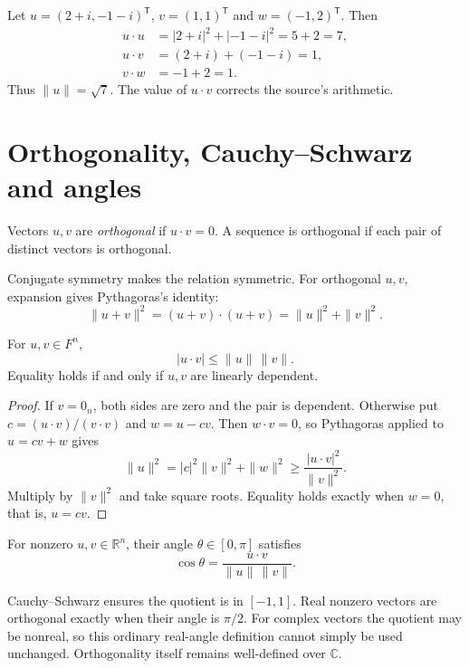 \begin{example}
Let $u=(2+i,-1-i)^{\mathsf T}$, $v=(1,1)^{\mathsf T}$ and
$w=(-1,2)^{\mathsf T}$. Then
\begin{align*}
 u\cdot u&=|2+i|^2+|-1-i|^2=5+2=7,\\
 u\cdot v&=(2+i)+(-1-i)=1,\\
 v\cdot w&=-1+2=1.
\end{align*}
Thus $\|u\|=\sqrt7$. The value of $u\cdot v$ corrects the source's arithmetic.
\end{example}

\section{Orthogonality, Cauchy--Schwarz and angles}

\begin{definition}
Vectors $u,v$ are \emph{orthogonal} if $u\cdot v=0$.
A sequence is orthogonal if each pair of distinct vectors is orthogonal.
\end{definition}

Conjugate symmetry makes the relation symmetric.
For orthogonal $u,v$, expansion gives Pythagoras's identity:
\[
 \|u+v\|^2=(u+v)\cdot(u+v)=\|u\|^2+\|v\|^2.
\]

\begin{theorem}
For $u,v\in F^n$,
\[
 \boxed{|u\cdot v|\leq\|u\|\,\|v\|.}
\]
Equality holds if and only if $u,v$ are linearly dependent.
\end{theorem}
\begin{proof}
If $v=0_n$, both sides are zero and the pair is dependent.
Otherwise put $c=(u\cdot v)/(v\cdot v)$ and $w=u-cv$.
Then $w\cdot v=0$, so Pythagoras applied to $u=cv+w$ gives
\[
 \|u\|^2=|c|^2\|v\|^2+\|w\|^2
 \geq\frac{|u\cdot v|^2}{\|v\|^2}.
\]
Multiply by $\|v\|^2$ and take square roots.
Equality holds exactly when $w=0$, that is, $u=cv$.
\end{proof}

\begin{definition}
For nonzero $u,v\in\mathbb R^n$, their angle $\theta\in[0,\pi]$ satisfies
\[
 \cos\theta=\frac{u\cdot v}{\|u\|\,\|v\|}.
\]
\end{definition}

Cauchy--Schwarz ensures the quotient is in $[-1,1]$.
Real nonzero vectors are orthogonal exactly when their angle is $\pi/2$.
For complex vectors the quotient may be nonreal, so this ordinary
real-angle definition cannot simply be used unchanged.
Orthogonality itself remains well-defined over $\mathbb C$.

